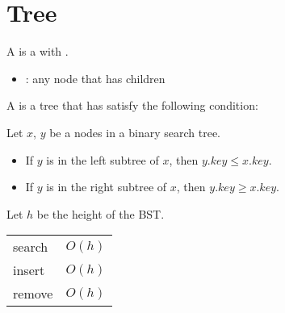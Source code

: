 \chapter{Tree}


    \par A  is a  with .
    \begin{itemize}
      \item {}: any node that has children
    \end{itemize}


    \par A  is a tree that has satisfy the
      following condition:
    \par Let $x$, $y$ be a nodes in a binary search tree. 
      \begin{itemize}
        \item If $y$ is in the left subtree of $x$, then $y.key \leq x.key$.
        \item If $y$ is in the right subtree of $x$, then $y.key \geq x.key$.
      \end{itemize}
    \par Let $h$ be the height of the BST.
      \begin{center}
        \begin{tabular}{|l|l|}
        \hline
               &        \\ \hline
        search & $O(h)$ \\ \hline
        insert & $O(h)$ \\ \hline
        remove & $O(h)$ \\ \hline
        \end{tabular}
      \end{center}


